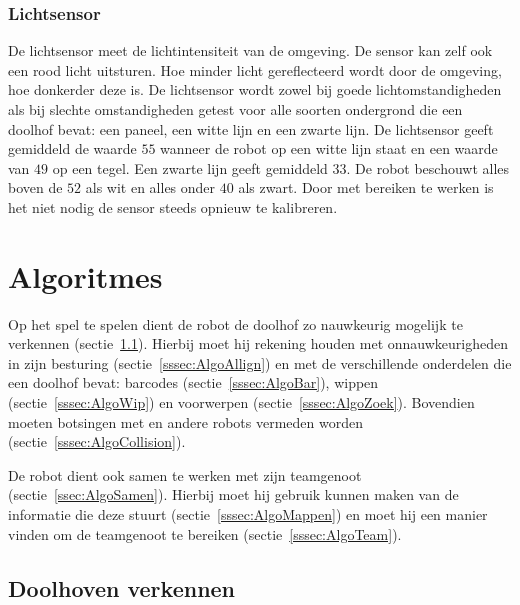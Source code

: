 \documentclass[eind]{penoverslag}
\begin{document}

\subsubsection{Lichtsensor}
De lichtsensor meet de lichtintensiteit van de omgeving. De sensor kan zelf ook een rood licht uitsturen. Hoe minder licht gereflecteerd wordt door de omgeving, hoe donkerder deze is.
De lichtsensor wordt zowel bij goede lichtomstandigheden als bij slechte omstandigheden getest voor alle soorten ondergrond die een doolhof bevat: een paneel, een witte lijn en een zwarte lijn.
De lichtsensor geeft gemiddeld de waarde $55$ wanneer de robot op een witte lijn staat en een waarde van $49$ op een tegel. Een zwarte lijn geeft gemiddeld $33$. De robot beschouwt alles boven de $52$ als wit en alles onder $40$ als zwart. Door met bereiken te werken is het niet nodig de sensor steeds opnieuw te kalibreren.



\section{Algoritmes}
\label{sec:Algo}

Op het spel te spelen dient de robot de doolhof zo nauwkeurig mogelijk te verkennen (sectie~\ref{ssec:AlgoVerken}). Hierbij moet hij rekening houden met onnauwkeurigheden in zijn besturing (sectie~\ref{sssec:AlgoAllign}) en met de verschillende onderdelen die een doolhof bevat: barcodes (sectie~\ref{sssec:AlgoBar}), wippen (sectie~\ref{sssec:AlgoWip}) en voorwerpen (sectie~\ref{sssec:AlgoZoek}). Bovendien moeten botsingen met en andere robots vermeden worden (sectie~\ref{sssec:AlgoCollision}).

De robot dient ook samen te werken met zijn teamgenoot (sectie~\ref{ssec:AlgoSamen}). Hierbij moet hij gebruik kunnen maken van de informatie die deze stuurt (sectie~\ref{sssec:AlgoMappen}) en moet hij een manier vinden om de teamgenoot te bereiken (sectie~\ref{sssec:AlgoTeam}).


\subsection{Doolhoven verkennen}
\label{ssec:AlgoVerken}
\end{document}
